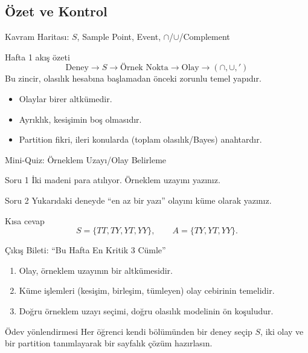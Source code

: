 \documentclass[light]{lutbeamer}
\begin{document}
\subsection{Özet ve Kontrol}
\begin{frame}[fragile]{Kavram Haritası: $S$, Sample Point, Event, $\cap$/$\cup$/Complement}
    \begin{block}{Hafta 1 akış özeti}
        \[
            \text{Deney} \rightarrow S \rightarrow \text{Örnek Nokta} \rightarrow \text{Olay} \rightarrow
            (\cap,\cup,')
        \]
        Bu zincir, olasılık hesabına başlamadan önceki zorunlu temel yapıdır.
    \end{block}

    \begin{itemize}
        \item Olaylar birer altkümedir.
        \item Ayrıklık, kesişimin boş olmasıdır.
        \item Partition fikri, ileri konularda (toplam olasılık/Bayes) anahtardır.
    \end{itemize}
\end{frame}

\begin{frame}{Mini-Quiz: Örneklem Uzayı/Olay Belirleme}
    \begin{exampleblock}{Soru 1}
        İki madeni para atılıyor. Örneklem uzayını yazınız.
    \end{exampleblock}

    \begin{exampleblock}{Soru 2}
        Yukarıdaki deneyde ``en az bir yazı'' olayını küme olarak yazınız.
    \end{exampleblock}

    \begin{block}{Kısa cevap}
        \[
            S=\{TT,TY,YT,YY\},\qquad
            A=\{TY,YT,YY\}.
        \]
    \end{block}
\end{frame}

\begin{frame}{Çıkış Bileti: ``Bu Hafta En Kritik 3 Cümle''}
    \begin{enumerate}
        \item Olay, örneklem uzayının bir altkümesidir.
        \item Küme işlemleri (kesişim, birleşim, tümleyen) olay cebirinin temelidir.
        \item Doğru örneklem uzayı seçimi, doğru olasılık modelinin ön koşuludur.
    \end{enumerate}

    \begin{alertblock}{Ödev yönlendirmesi}
        Her öğrenci kendi bölümünden bir deney seçip $S$, iki olay ve bir partition
        tanımlayarak bir sayfalık çözüm hazırlasın.
    \end{alertblock}
\end{frame}
\end{document}
